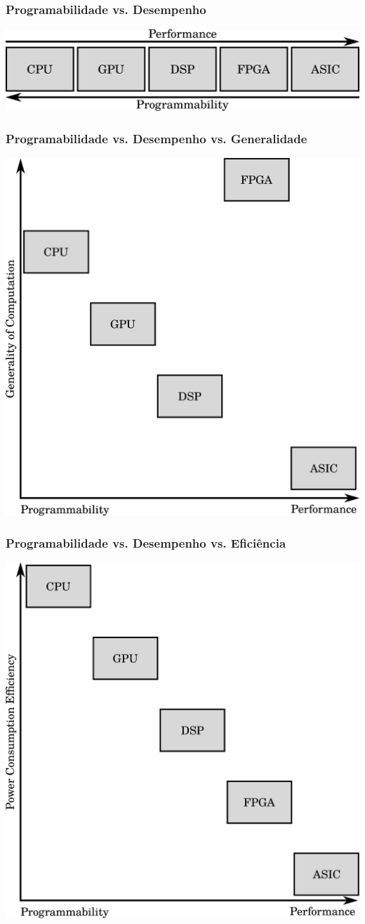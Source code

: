 \documentclass[10pt, compress]{beamer}
\begin{document}
\begin{frame}
    \frametitle{Programabilidade vs. Desempenho}
    \begin{center}
        \includegraphics[width=\textwidth]{fpga-tradeoff}
    \end{center}
\end{frame}

\begin{frame}
    \frametitle{Programabilidade vs. Desempenho vs. Generalidade}
    \begin{center}
        \includegraphics[width=.7\textwidth]{fpga-tradeoff-2}
    \end{center}
\end{frame}

\begin{frame}
    \frametitle{Programabilidade vs. Desempenho vs. Eficiência}
    \begin{center}
        \includegraphics[width=.7\textwidth]{fpga-tradeoff-3}
    \end{center}
\end{frame}
\end{document}
